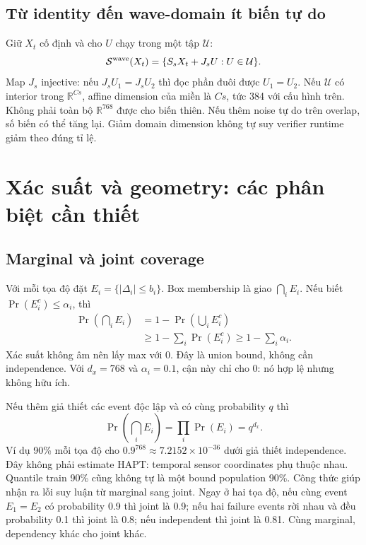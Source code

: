 \documentclass[11pt,a4paper]{article}
\newcommand{\R}{\mathbb R}
\newcommand{\Sset}{\mathcal S}
\newcommand{\Uset}{\mathcal U}
\theoremstyle{definition}
\begin{document}
\subsection{Từ identity đến wave-domain ít biến tự do}
Giữ $X_t$ cố định và cho $U$ chạy trong một tập $\Uset$:
\begin{equation}
\Sset^{\rm wave}(X_t)=\{S_sX_t+J_sU:U\in\Uset\}.
\label{eq:wave-domain}
\end{equation}
Map $J_s$ injective: nếu $J_sU_1=J_sU_2$ thì đọc phần đuôi được $U_1=U_2$.
Nếu $\Uset$ có interior trong $\R^{Cs}$, affine dimension của miền là
$Cs$, tức 384 với cấu hình trên. Không phải toàn bộ $\R^{768}$ được cho
biến thiên. Nếu thêm noise tự do trên overlap, số biến có thể tăng lại.
Giảm domain dimension không tự suy verifier runtime giảm theo đúng tỉ lệ.

\section{Xác suất và geometry: các phân biệt cần thiết}
\subsection{Marginal và joint coverage}
Với mỗi tọa độ đặt $E_i=\{|\Delta_i|\le b_i\}$. Box membership là giao
$\bigcap_iE_i$. Nếu biết $\Pr(E_i^c)\le\alpha_i$, thì
\begin{align}
\Pr\left(\bigcap_iE_i\right)
&=1-\Pr\left(\bigcup_iE_i^c\right)\\
&\ge1-\sum_i\Pr(E_i^c)\ge1-\sum_i\alpha_i.
\end{align}
Xác suất không âm nên lấy max với 0. Đây là union bound, không cần
independence. Với $d_x=768$ và $\alpha_i=0.1$, cận này chỉ cho 0: nó hợp
lệ nhưng không hữu ích.

Nếu thêm giả thiết các event độc lập và có cùng probability $q$ thì
\begin{equation}
\Pr\left(\bigcap_iE_i\right)=\prod_i\Pr(E_i)=q^{d_x}.
\end{equation}
Ví dụ 90\% mỗi tọa độ cho $0.9^{768}\approx7.2152\times10^{-36}$ dưới
giả thiết independence. Đây không phải estimate HAPT: temporal sensor
coordinates phụ thuộc nhau. Quantile train 90\% cũng không tự là một bound
population 90\%. Công thức giúp nhận ra lỗi suy luận từ marginal sang joint.
Ngay ở hai tọa độ, nếu cùng event $E_1=E_2$ có probability 0.9 thì joint
là 0.9; nếu hai failure events rời nhau và đều probability 0.1 thì joint
là 0.8; nếu independent thì joint là 0.81. Cùng marginal, dependency khác
cho joint khác.
\end{document}
